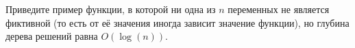 Приведите пример функции, в которой ни одна из $n$ переменных не является фиктивной (то есть от её значения иногда зависит
значение функции), но глубина дерева решений равна $O(\log(n))$.